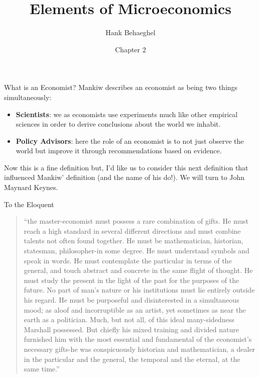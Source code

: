 \documentclass[aspectratio=169]{beamer}
\title{Elements of Microeconomics}
\author{Hank Behaeghel}
\institute{Johns Hopkins University}
\date{Chapter 2}
\begin{document}
\maketitle

\begin{frame}{What is an Economist?}
    Mankiw describes an economist as being two things simultaneously:
    \vspace{10pt}
    \begin{itemize}[label = $\bullet$, itemsep = 10pt]
        \item \textbf{Scientists}: we as economists use experiments much like other empirical sciences in order to derive conclusions about the world we inhabit.
        \item \textbf{Policy Advisors}: here the role of an economist is to not just observe the world but improve it through recommendations based on evidence. 
    \end{itemize}
    \vspace{10pt}
    Now this is a fine definition but, I'd like us to consider this next definition that influenced Mankiw' definition (and the name of his do!). We will turn to John Maynard Keynes.
\end{frame}

\begin{frame}{To the Eloquent}

\begin{quote}
    \enquote{the master-economist must possess a rare combination of gifts. 
    He must reach a high standard in several
    different directions and must combine talents not often found
    together. He must be mathematician, historian, statesman,
    philosopher-in some degree. He must understand symbols
    and speak in words. He must contemplate the particular in
    terms of the general, and touch abstract and concrete in the same
    flight of thought. He must study the present in the light of
    the past for the purposes of the future. No part of man's nature
    or his institutions must lie entirely outside his regard. He must
    be purposeful and disinterested in a simultaneous mood; as
    aloof and incorruptible as an artist, yet sometimes as near the earth
    as a politician. Much, but not all, of this ideal many-sidedness
    Marshall possessed. But chiefly his mixed training and divided
    nature furnished him with the most essential and fundamental
    of the economist's necessary gifts-he was conspicuously historian
    and mathematician, a dealer in the particular and the general,
    the temporal and the eternal, at the same time.}
\end{quote}

\end{frame}
\end{document}
